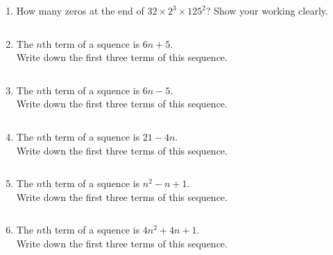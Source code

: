 \begin{enumerate} [leftmargin=0cm]
\item   How many zeros at the end of $32 \times 2^3 \times 125^2$? Show your working clearly.       \begin{envAnswer}[blankline= 2 ] $  $ \end{envAnswer}
                
                
\item   The $n$th term of a squence is $6n+5$. \\            
   Write down the first three terms of this sequence. \\      \begin{envAnswer}[blankline= 2 ] $  $ \end{envAnswer}
                
\item   The $n$th term of a squence is $6n-5$. \\            
   Write down the first three terms of this sequence. \\      \begin{envAnswer}[blankline= 2 ] $  $ \end{envAnswer}

\item   The $n$th term of a squence is $21-4n$. \\             
   Write down the first three terms of this sequence. \\       \begin{envAnswer}[blankline= 2 ] $  $ \end{envAnswer}

\item   The $n$th term of a squence is $n^2-n+1$. \\             
   Write down the first three terms of this sequence. \\       \begin{envAnswer}[blankline= 2 ] $  $ \end{envAnswer}

\item   The $n$th term of a squence is $4n^2+4n+1$. \\             
   Write down the first three terms of this sequence. \\       \begin{envAnswer}[blankline= 2 ] $  $ \end{envAnswer}















\end{enumerate}

\clearpage

